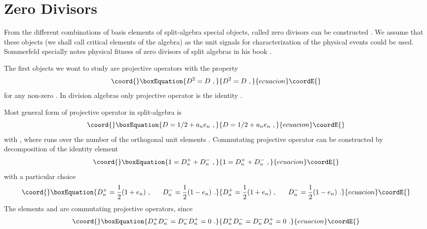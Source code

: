 \documentclass[a4paper,12pt]{article}
\begin{document}

\section{Zero Divisors}

From the different combinations of basis elements of split-algebra special objects, called 
zero divisors can be constructed \cite{Sc, SoLo}. We assume that these objects (we shall 
call critical elements of the algebra) as the unit signals for characterization of the 
physical events could be used. Sommerfeld specially notes physical fitness of zero divisors 
of split algebras in his book \cite{So}. 

The first objects we wont to study are projective operators with the property 
\begin{equation}\coord{}\boxEquation{ \label{D}
D^2 = D ~,
}{ D^2 = D ~,
}{ecuacion}\coordE{}\end{equation}
for any non-zero \coordHE{}. In division algebras only projective operator is the identity \coordHE{}.

Most general form of projective operator in split-algebra is 
\begin{equation}\coord{}\boxEquation{ \label{anen}
D = 1/2 + a_n e_n ~,
}{ D = 1/2 + a_n e_n ~,
}{ecuacion}\coordE{}\end{equation}
with \coordHE{}, where \coordHE{} runs over the number of the orthogonal unit elements \coordHE{}. 
Commutating projective operator can be constructed by decomposition of the identity element 
\begin{equation}\coord{}\boxEquation{ \label{1}
1 = D^+_n + D^-_n ~,
}{ 1 = D^+_n + D^-_n ~,
}{ecuacion}\coordE{}\end{equation}
with a particular choice 
\begin{equation}\coord{}\boxEquation{ \label{D=pm}
D^+_n = \frac{1}{2}(1 + e_n)~, ~~~~~D^-_n = \frac{1}{2}(1 - e_n) ~.
}{ D^+_n = \frac{1}{2}(1 + e_n)~, ~~~~~D^-_n = \frac{1}{2}(1 - e_n) ~.
}{ecuacion}\coordE{}\end{equation}
The elements \coordHE{} and \coordHE{} are commutating projective operators, since 
\begin{equation}\coord{}\boxEquation{ \label{commuting}
D^+_nD^-_n = D^-_nD^+_n = 0 ~.
}{ D^+_nD^-_n = D^-_nD^+_n = 0 ~.
}{ecuacion}\coordE{}\end{equation}
\end{document}
